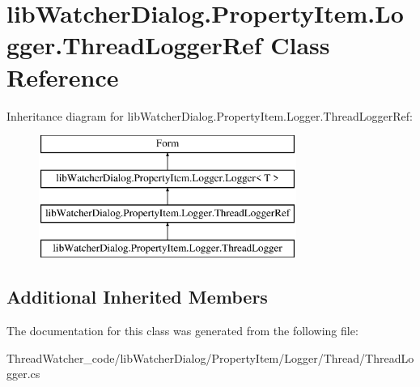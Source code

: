 \hypertarget{classlib_watcher_dialog_1_1_property_item_1_1_logger_1_1_thread_logger_ref}{\section{lib\+Watcher\+Dialog.\+Property\+Item.\+Logger.\+Thread\+Logger\+Ref Class Reference}
\label{classlib_watcher_dialog_1_1_property_item_1_1_logger_1_1_thread_logger_ref}
}
Inheritance diagram for lib\+Watcher\+Dialog.\+Property\+Item.\+Logger.\+Thread\+Logger\+Ref\+:\begin{figure}[H]
\begin{center}
\leavevmode
\includegraphics[height=4.000000cm]{classlib_watcher_dialog_1_1_property_item_1_1_logger_1_1_thread_logger_ref}
\end{center}
\end{figure}
\subsection*{Additional Inherited Members}


The documentation for this class was generated from the following file\+:\begin{DoxyCompactItemize}
\item 
Thread\+Watcher\+\_\+code/lib\+Watcher\+Dialog/\+Property\+Item/\+Logger/\+Thread/Thread\+Logger.\+cs\end{DoxyCompactItemize}
